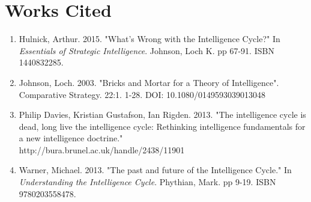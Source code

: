 \documentclass[10pt, letterpaper]{article}
\begin{document}
\section{Works Cited}
\begin{enumerate}
    \item Hulnick, Arthur. 2015. "What's Wrong with the Intelligence Cycle?" In \textit{Essentials of Strategic Intelligence}. Johnson, Loch K. pp 67-91. ISBN 1440832285.
    
    \item  Johnson, Loch. 2003. "Bricks and Mortar for a Theory of Intelligence". Comparative Strategy. 22:1. 1-28. DOI: 10.1080/0149593039013048
    
    \item  Philip Davies, Kristian Gustafson, Ian Rigden. 2013. "The intelligence cycle is dead, long live the intelligence cycle: Rethinking intelligence fundamentals for a new intelligence doctrine." \\ http://bura.brunel.ac.uk/handle/2438/11901 
    
    \item Warner, Michael. 2013. "The past and future of the Intelligence Cycle." In \textit{Understanding the Intelligence Cycle}. Phythian, Mark. pp 9-19. ISBN 9780203558478.
\end{enumerate}
\end{document}
